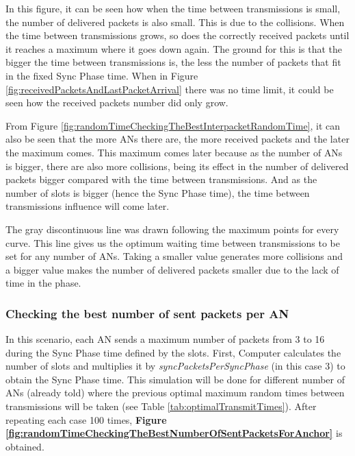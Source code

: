 In this figure, it can be seen how when the time between transmissions is small, the number of delivered packets is also small. This is due to the 
collisions. When the time between transmissions grows, so does the correctly received packets until it reaches a maximum where it goes down again.
The ground for this is that the bigger the time between transmissions is, the less the number of packets that fit in the fixed Sync Phase time. When in 
Figure \ref{fig:receivedPacketsAndLastPacketArrival} there was no time limit, it could be seen how the received packets number did only grow.

From Figure \ref{fig:randomTimeCheckingTheBestInterpacketRandomTime}, it can also be seen that the more \acp{AN} there are, the more received packets and
the later the maximum comes. This maximum comes later because as the number of \acp{AN} is bigger, there are also more collisions, being its effect in the 
number of delivered packets bigger compared with the time between transmissions. And as the number of slots is bigger (hence the Sync Phase time), the 
time between transmissions influence will come later.

The gray discontinuous line was drawn following the maximum points for every curve. This line gives us the optimum waiting time between transmissions to 
be set for any number of \acp{AN}. Taking a smaller value generates more collisions and a bigger value makes the number of delivered packets smaller due
to the lack of time in the phase.

\subsubsection{Checking the best number of sent packets per \ac{AN}}

In this scenario, each \ac{AN} sends a maximum number of packets from 3 to 16 during the Sync Phase time defined by the slots. First, Computer calculates 
the number of slots and multiplies it by \textit{syncPacketsPerSyncPhase} (in this case 3) to obtain the Sync Phase time. This simulation will be done 
for different number of \acp{AN} (already told) where the previous optimal maximum random times between transmissions will be taken (see Table
\ref{tab:optimalTransmitTimes}). After repeating each case 100 times, \textbf{Figure \ref{fig:randomTimeCheckingTheBestNumberOfSentPacketsForAnchor}} 
is obtained.

